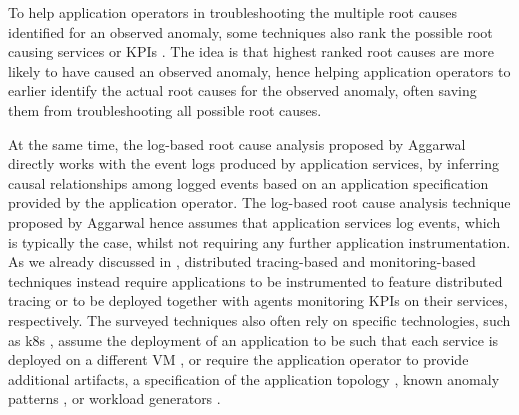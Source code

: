 To help application operators in troubleshooting the multiple root causes identified for an observed anomaly, some techniques also rank the possible root causing services \cite{41_Mi2013_PerformanceDiagnosisCloud,21_Kim2013_RootCauseDetectionSOA,47_Liu2021_MicroHECL,42_Nguyen2011_PAL,43_Nguyen2013_FChain,11_Brandon2020_GraphBasedRootCauseAnalysis,40_Chen2020_CauseInfer,48_Chen2014_CauseInfer,06_Lin2018_Microscope,19_Guan2019_MicroscopeDemo,29_Wang2018_CloudRanger,07_Ma2019_MSRank,25_Ma2020_MSRankExtended,08_Ma2020_AutoMAP,44_Lin2018_FacGraph} or KPIs \cite{05_Meng2020_RootCausesMicroservices,46_Qiu2020_CausalityMiningKnowledgeGraph,13_Mariani2018_LocalizingFaultsCloudSystems}.
The idea is that highest ranked root causes are more likely to have caused an observed anomaly, hence helping application operators to earlier identify the actual root causes for the observed anomaly, often saving them from troubleshooting all possible root causes.

At the same time, the log-based root cause analysis proposed by Aggarwal \etal \cite{10_Aggarwal2020_FaultsGoldenSignals} directly works with the event logs produced by application services, by inferring causal relationships among logged events based on an application specification provided by the application operator. 
The log-based root cause analysis technique proposed by Aggarwal \etal \cite{10_Aggarwal2020_FaultsGoldenSignals} hence assumes that application services log events, which is typically the case, whilst not requiring any further application instrumentation.
As we already discussed in , distributed tracing-based and monitoring-based techniques instead require applications to be instrumented to feature distributed tracing or to be deployed together with agents monitoring KPIs on their services, respectively.
The surveyed techniques also often rely on specific technologies, such as k8s \cite{49_Shan2019_epsilonDiagnosis,04_Wu2020_MicroRCA,09_Wu2020_MicroserviceDiagnosisDeepLearning,14_Samir2019_DLA}, assume the deployment of an application to be such that each service is deployed on a different VM \cite{42_Nguyen2011_PAL,43_Nguyen2013_FChain}, or require the application operator to provide additional artifacts, \eg a specification of the application topology \cite{10_Aggarwal2020_FaultsGoldenSignals,14_Samir2019_DLA,46_Qiu2020_CausalityMiningKnowledgeGraph}, known anomaly patterns \cite{11_Brandon2020_GraphBasedRootCauseAnalysis}, or workload generators \cite{04_Wu2020_MicroRCA,09_Wu2020_MicroserviceDiagnosisDeepLearning,13_Mariani2018_LocalizingFaultsCloudSystems}.

